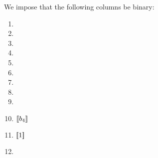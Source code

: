 We impose that the following columns be binary:
\begin{multicols}{3}
	\begin{enumerate}
		\item \isAnd{}       
		\item \isOr{}        
		\item \isXor{}       
		\item \isNot{}       
		\item \isByte{}      
		\item \isSignextend{}
		\item \smallness
		\item \BITS
		\item \NEG
		\item $[\![b_4]\!]$
		\item $[\![1]\!]$
		\item[\vspace{\fill}]
	\end{enumerate}
\end{multicols}
